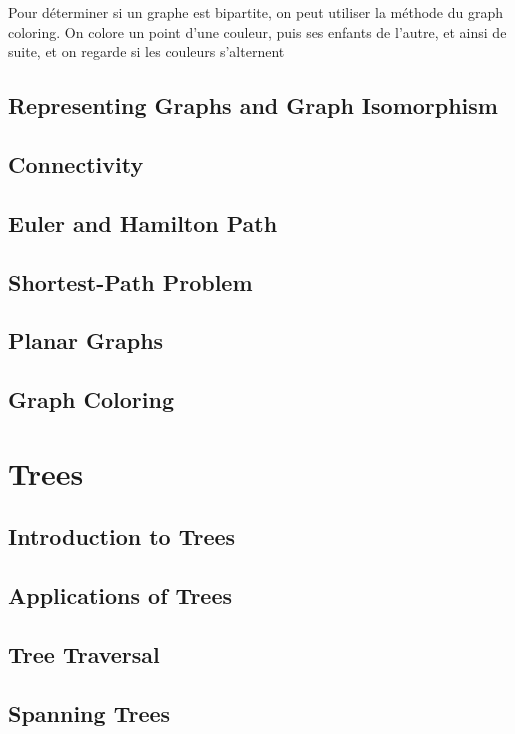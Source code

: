\documentclass{article}
\begin{document}
\begin{remark}
    Pour déterminer si un graphe est bipartite, on peut utiliser la
    méthode du graph coloring. On colore un point d'une couleur, puis
    ses enfants de l'autre, et ainsi de suite, et on regarde si
    les couleurs s'alternent
\end{remark}

\subsection{Representing Graphs and Graph Isomorphism}
\subsection{Connectivity}
\subsection{Euler and Hamilton Path}
\subsection{Shortest-Path Problem}
\subsection{Planar Graphs}
\subsection{Graph Coloring}

\section{Trees}

\subsection{Introduction to Trees}
\subsection{Applications of Trees }
\subsection{Tree Traversal }
\subsection{Spanning Trees }
\end{document}
